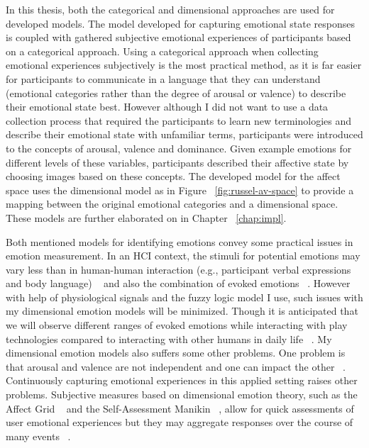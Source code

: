 In this thesis, both the categorical and dimensional approaches are used for developed models. The model developed for capturing emotional state responses is coupled with gathered subjective emotional experiences of participants based on a categorical approach. Using a categorical approach when collecting emotional experiences subjectively is the most practical method, as it is far easier for participants to communicate in a language that they can understand (emotional categories rather than the degree of arousal or valence) to describe their emotional state best. However although I did not want to use a data collection process that required the participants to learn new terminologies and describe their emotional state with unfamiliar terms, participants were introduced to the concepts of arousal, valence and dominance. Given example emotions for different levels of these variables, participants described their affective state by choosing images based on these concepts. The developed model for the affect space uses the dimensional model as in Figure ~\ref{fig:russel-av-space} to provide a mapping between the original emotional categories and a dimensional space. These models are further elaborated on in Chapter ~\ref{chap:impl}.

Both mentioned models for identifying emotions convey some practical issues in emotion measurement. In an HCI context, the stimuli for potential emotions may vary less than in human-human interaction (e.g., participant verbal expressions and body language) ~\cite{zhang2010service} and also the combination of evoked emotions ~\cite{peter2006emotion}. However with help of physiological signals and the fuzzy logic model I use, such issues with my dimensional emotion models will be minimized. Though it is anticipated that we will observe different ranges of evoked emotions while interacting with play technologies compared to interacting with other humans in daily life ~\cite{zhang2010service}. My dimensional emotion models also suffers some other problems. One problem is that arousal and valence are not independent and one can impact the other ~\cite{mandryk2007fuzzy}. Continuously capturing emotional experiences in this applied setting raises other problems. Subjective measures based on dimensional emotion theory, such as the Affect Grid ~\cite{russell1989affect} and the Self-Assessment Manikin ~\cite{bradley1994measuring}, allow for quick assessments of user emotional experiences but they may aggregate responses over the course of many events ~\cite{zhang2010service}.

